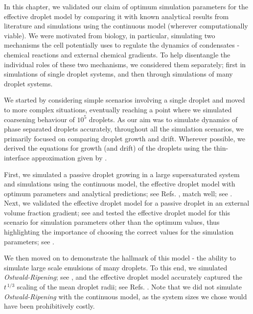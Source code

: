 In this chapter, we validated our claim of optimum simulation parameters for the effective droplet model by comparing it with known analytical results from literature and simulations using the continuous model (wherever computationally viable).
We were motivated from biology, in particular, simulating two mechanisms the cell potentially uses to regulate the dynamics of condensates - chemical reactions and external chemical gradients.
To help disentangle the individual roles of these two mechanisms, we considered them separately; first in simulations of single droplet systems, and then through simulations of many droplet systems. 

We started by considering simple scenarios involving a single droplet and moved to more complex situations, eventually reaching a point where we simulated coarsening behaviour of $10^5$ droplets.
As our aim was to simulate dynamics of phase separated droplets accurately, throughout all the simulation scenarios, we primarily focused on comparing droplet growth and drift.
Wherever possible, we derived the equations for growth (and drift) of the droplets using the thin-interface approximation given by .

First, we simulated a passive droplet growing in a large supersaturated system and simulations using the continuous model, the effective droplet model with optimum parameters and analytical predictions; see Refs. \cite{Review2019,Weber2017}, match well; see .
Next, we validated the effective droplet model for a passive droplet in an external volume fraction gradient; see  and tested the effective droplet model for this scenario for simulation parameters other than the optimum values, thus highlighting the importance of choosing the correct values for the simulation parameters; see .

We then moved on to demonstrate the hallmark of this model - the ability to simulate large scale emulsions of many droplets. 
To this end, we simulated \textit{Ostwald-Ripening}; see , and the effective droplet model accurately captured the $t^{\,1/3}$ scaling of the mean droplet radii; see Refs. \cite{Review2019,LSWanalytics}.
Note that we did not simulate \textit{Ostwald-Ripening} with the continuous model, as the system sizes we chose would have been prohibitively costly.

